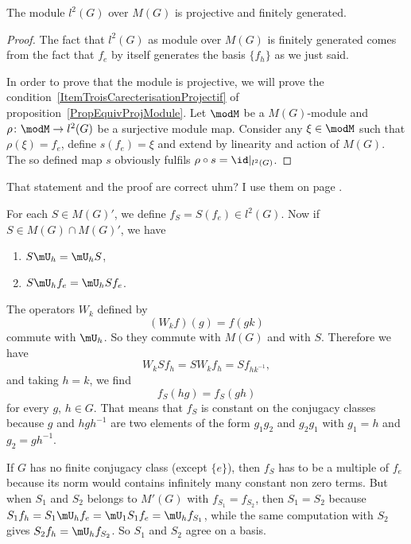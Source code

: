 \begin{proposition}		\label{ProplDeuxGFGP}
	The module $l^2(G)$ over $M(G)$ is projective and finitely generated.
\end{proposition}

\begin{proof}
	The fact that $l^2(G)$ as module over $M(G)$ is finitely generated comes from the fact that $f_e$ by itself generates the basis $\{ f_h \}$ as we just said.

	In order to prove that the module is projective, we will prove the condition~\ref{ItemTroisCarecterisationProjectif} of proposition~\ref{PropEquivProjModule}. Let $\modM$ be a $M(G)$-module and $\rho\colon \modM\to l^2(G)$ be a surjective module map. Consider any $\xi\in\modM$ such that $\rho(\xi)=f_e$, define $s(f_e)=\xi$ and extend by linearity and action of $M(G)$. The so defined map $s$ obviously fulfils $\rho\circ s=\id|_{l^2(G)}$.
\end{proof}

\begin{probleme}
	That statement and the proof are correct uhm? I use them on page \pageref{PglDeuxGFGPutiliseIci}.
\end{probleme}

For each $S\in M(G)'$, we define $f_S=S(f_e)\in l^2(G)$. Now if $S\in M(G)\cap M(G)'$, we have
\begin{enumerate}
	\item $S\mU_h=\mU_hS$,
	\item $S\mU_hf_e=\mU_hS f_e$.
\end{enumerate}
The operators $W_k$ defined by
\[
	(W_kf)(g)=f(gk)
\]
commute with $\mU_h$. So they commute with $M(G)$ and with $S$. Therefore we have
\[
	W_kSf_h=SW_kf_h=Sf_{hk^{-1}},
\]
and taking $h=k$, we find
\begin{equation}
	f_S(hg)=f_S(gh)
\end{equation}
for every $g$, $h\in G$. That means that $f_S$ is constant on the conjugacy classes because $g$ and $hgh^{-1}$ are two elements of the form $g_1g_2$ and $g_2g_1$ with $g_1=h$ and $g_2=gh^{-1}$.

If $G$ has no finite conjugacy class (except $\{ e \}$), then $f_S$ has to be a multiple of $f_e$ because its norm would contains infinitely many constant non zero terms. But when $S_1$ and $S_2$ belongs to $M'(G)$ with $f_{S_1}=f_{S_2}$, then $S_1=S_2$ because $S_1f_h=S_1\mU_hf_e=\mU_1S_1f_e=\mU_hf_{S_1}$, while the same computation with $S_2$ gives $S_2 f_h=\mU_hf_{S_2}$. So $S_1$ and $S_2$ agree on a basis.

